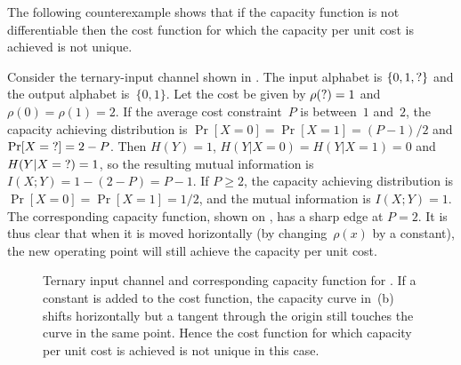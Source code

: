 The following counterexample shows that if the capacity function is not
differentiable then the cost function for which the capacity per unit cost is
achieved is not unique.

\begin{example}
  \label{ex:nondiffcapacity}
  Consider the ternary-input channel shown in . The
  input alphabet is $\{0,1,\?\}$ and the output alphabet
  is~$\{0,1\}$. Let the cost be given by $\rho(\?) = 1$ and $\rho(0) = \rho(1) =
  2$. If the average cost constraint~$P$ is between~$1$ and~$2$, the capacity
  achieving distribution is $\Pr[X=0] = \Pr[X=1] = (P-1)/2$ and $\Pr[X = \?] = 2
  - P$. Then $H(Y) = 1$, $H(Y|X=0) = H(Y|X=1) = 0$ and $H(Y|X=\?) = 1$, so the
  resulting mutual information is $I(X;Y) = 1 - (2-P) = P - 1$.  If $P \ge 2$,
  the capacity achieving distribution is $\Pr[X=0] = \Pr[X = 1] = 1/2$, and the
  mutual information is $I(X;Y) = 1$. The corresponding capacity function, shown
  on , has a sharp edge at $P=2$. It is thus clear that
  when it is moved horizontally (by changing~$\rho(x)$ by a constant), the new
  operating point will still achieve the capacity per unit cost.
  \begin{figure}
    \centerline{%
      \hfil
      }%
    \caption{Ternary input channel and corresponding capacity function for
    . If a constant is added to the cost function, the
    capacity curve in~(b) shifts horizontally but a tangent through the origin
    still touches the curve in the same point. Hence the cost function for which
    capacity per unit cost is achieved is not unique in this case.}
  \end{figure}
\end{example}

